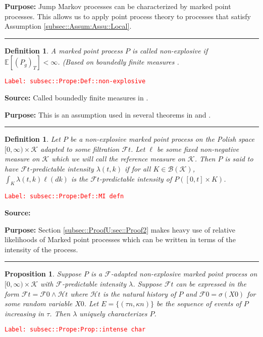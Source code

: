 \documentclass[12pt]{article}
\newcommand{\mb}{\mathbb}
\newcommand{\mc}{\mathcal}
\newcommand{\ms}{\mathscr}
\newcommand{\tr}{\textcolor{red}}
\newcommand{\labe}[1]{\tr{\texttt{Label: #1}}}
\newcommand{\purpose}{\textbf{Purpose: }}
\newcommand{\lin}{\rule{\linewidth}{0.4 pt}}
\newcommand{\ex}[1]{\mb{E}\left[#1\right]}			%
\renewcommand{\t}{t}							%
\newcommand{\F}{\mc{F}}							%
\newcommand{\FH}{\mc{H}}						%
\newcommand{\X}{X}								%
\newcommand{\rate}{\lambda}						%
\newcommand{\rt}{\tau}							%
\renewcommand{\mark}{\kappa}					%
\newcommand{\rp}{P}								%
\newcommand{\mspce}{\mc{K}}						%
\newcommand{\rpg}{\rp_g}						%
\newtheorem{prop}[thms]{Proposition}
\newtheorem{defn}[thms]{Definition}
\begin{document}
\purpose Jump Markov processes can be characterized by marked point processes. This allows us to apply point process theory to processes that satisfy Assumption \ref{subsec::Assum:Assu::Local}.

\lin

\begin{defn}
A marked point process \(\rp\) is called non-explosive if \(\ex{(\rpg)_T} < \infty\). (Based on boundedly finite measures \cite[Definition 9.1.I]{DalVer08}.
\label{subsec::Prope:Def::non-explosive}
\end{defn}
\labe{subsec::Prope:Def::non-explosive}

\textbf{Source: } Called boundedly finite measures in \cite[Definition 9.1.I]{DalVer08}.

\purpose This is an assumption used in several theorems in \cite{DalVer03} and \cite{DalVer08}.

\lin

\begin{defn}
Let \(\rp\) be a non-explosive marked point process on the Polish space \([0,\infty)\times \mspce\) adapted to some filtration \(\F{\t}\). Let \(\ell\) be some fixed non-negative measure on \(\mspce\) which we will call the reference measure on \(\mspce\). Then \(\rp\) is said to have \(\F{\t}\)-predictable intensity \(\rate(\t,k)\) if for all \(K \in \ms{B}(\mspce)\), \(\int_K \rate(\t,k)\ell(dk)\) is the \(\F{\t}\)-predictable intensity of \(\rp([0,\t]\times K)\). 
\label{subsec::Prope:Def::MI defn}
\end{defn}
\labe{subsec::Prope:Def::MI defn}

\textbf{Source: }\cite[Definition 14.3.I]{DalVer08}

\purpose Section \ref{subsec::ProofU:sec::Proof2} makes heavy use of relative likelihoods of Marked point processes which can be written in terms of the intensity of the process.

\lin

\begin{prop}
Suppose \(\rp\) is a \(\F\)-adapted non-explosive marked point process on \([0,\infty)\times \mspce\) with \(\F\)-predictable intensity \(\rate\). Suppose \(\F{\t}\) can be expressed in the form \(\F{\t} = \F{0}\wedge \FH{\t}\) where \(\FH{\t}\) is the natural history of \(\rp\) and \(\F{0} = \sigma(\X{}{0})\) for some random variable \(\X{}{0}\). Let \(E = \{(\rt{n},\mark{n})\}\) be the sequence of events of \(\rp\) increasing in \(\rt\). Then \(\rate\) uniquely characterizes \(\rp\).
\label{subsec::Prope:Prop::intense char}
\end{prop}
\labe{subsec::Prope:Prop::intense char}
\end{document}
